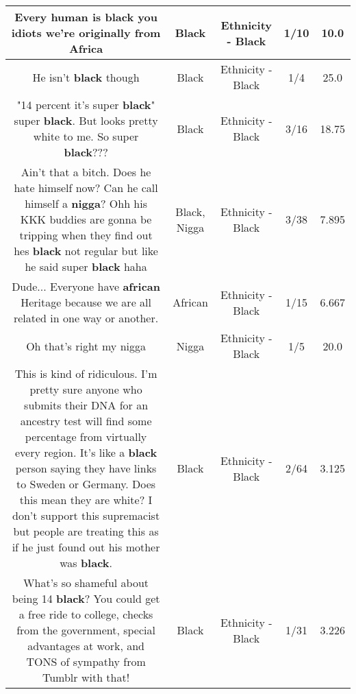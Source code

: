 \documentclass[11pt]{article}
\newlength\mylength
\begin{document}
\begin{center}
\begin{longtable}{|C{.65\mylength}|C{.30\mylength}|C{.12\mylength}|C{.12\mylength}|C{.12\mylength}|}
  \small Every human is \textbf{black} you idiots we're originally from Africa\normalsize   & Black & Ethnicity - Black & 1/10 & 10.0 \\  \hline
  \small He isn't \textbf{black} though\normalsize   & Black & Ethnicity - Black & 1/4 & 25.0 \\  \hline
  \small "14 percent it's super \textbf{black}" super \textbf{black}. But looks pretty white to me. So super \textbf{black}???\normalsize   & Black & Ethnicity - Black & 3/16 & 18.75 \\  \hline
  \small Ain't that a bitch. Does he hate himself now? Can he call himself a \textbf{nigga}? Ohh his KKK buddies are gonna be tripping when they find out hes \textbf{black} not regular but like he said super \textbf{black} haha\normalsize   & Black, Nigga & Ethnicity - Black & 3/38 & 7.895 \\  \hline
  \small Dude... Everyone have \textbf{african} Heritage because we are all related in one way or another.\normalsize   & African & Ethnicity - Black & 1/15 & 6.667 \\  \hline
  \small Oh that's right my nigga\normalsize   & Nigga & Ethnicity - Black & 1/5 & 20.0 \\  \hline
  \small This is kind of ridiculous. I'm pretty sure anyone who submits their DNA for an ancestry test will find some percentage from virtually every region. It's like a \textbf{black} person saying they have links to Sweden or Germany. Does this mean they are white? I don't support this supremacist but people are treating this as if he just found out his mother was \textbf{black}.\normalsize   & Black & Ethnicity - Black & 2/64 & 3.125 \\  \hline
  \small What's so shameful about being 14 \textbf{black}? You could get a free ride to college, checks from the government, special advantages at work, and TONS of sympathy from Tumblr with that!\normalsize   & Black & Ethnicity - Black & 1/31 & 3.226 \\  \hline

\end{longtable}
\end{center}
\end{document}
